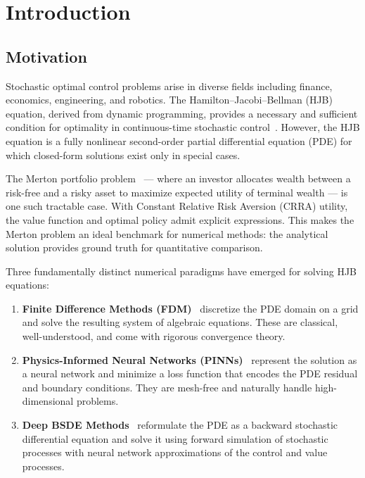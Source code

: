 \documentclass[12pt,a4paper]{article}
\begin{document}
\newpage
\tableofcontents
\newpage

\section{Introduction}
\label{sec:introduction}

\subsection{Motivation}

Stochastic optimal control problems arise in diverse fields including finance, economics, engineering, and robotics. The Hamilton--Jacobi--Bellman (HJB) equation, derived from dynamic programming, provides a necessary and sufficient condition for optimality in continuous-time stochastic control~\cite{merton1969,merton1971,pham2009}. However, the HJB equation is a fully nonlinear second-order partial differential equation (PDE) for which closed-form solutions exist only in special cases.

The Merton portfolio problem~\cite{merton1969} --- where an investor allocates wealth between a risk-free and a risky asset to maximize expected utility of terminal wealth --- is one such tractable case. With Constant Relative Risk Aversion (CRRA) utility, the value function and optimal policy admit explicit expressions. This makes the Merton problem an ideal benchmark for numerical methods: the analytical solution provides ground truth for quantitative comparison.

Three fundamentally distinct numerical paradigms have emerged for solving HJB equations:

\begin{enumerate}
    \item \textbf{Finite Difference Methods (FDM)}~\cite{kushner2001,forsyth2005} discretize the PDE domain on a grid and solve the resulting system of algebraic equations. These are classical, well-understood, and come with rigorous convergence theory.
    
    \item \textbf{Physics-Informed Neural Networks (PINNs)}~\cite{raissi2019} represent the solution as a neural network and minimize a loss function that encodes the PDE residual and boundary conditions. They are mesh-free and naturally handle high-dimensional problems.
    
    \item \textbf{Deep BSDE Methods}~\cite{han2018,e2017} reformulate the PDE as a backward stochastic differential equation and solve it using forward simulation of stochastic processes with neural network approximations of the control and value processes.
\end{enumerate}
\end{document}
